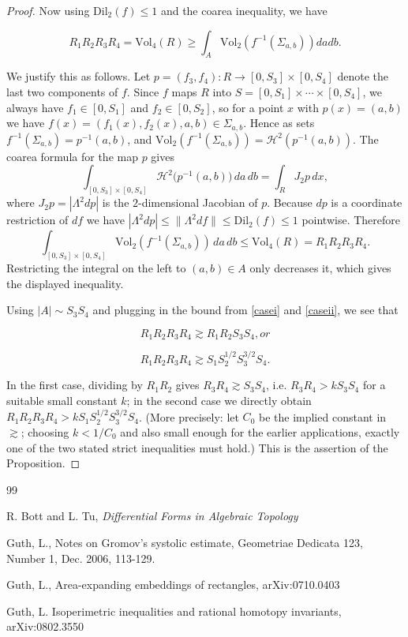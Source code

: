 \documentclass{amsart}
\newtheorem*{theorem 1}{Theorem 1}
\newtheorem*{theorem 2}{Theorem 2}
\newtheorem*{theorem 3}{Theorem 3}
\numberwithin{equation}{section}
\newcommand{\Dil}{\textrm{Dil}}
\newcommand{\Vol}{\textrm{Vol}}
\begin{document}
\begin{proof}
Now using $\Dil_2(f) \le 1$ and the coarea inequality,  we have

$$ R_1 R_2 R_3 R_4 = \Vol_4 (R) \ge \int_{A} \Vol_2(f^{-1}(\Sigma_{a,b})) da db. $$

We justify this as follows.  Let $p = (f_3, f_4): R \to [0,S_3]
\times [0, S_4]$ denote the last two components of $f$.  Since $f$
maps $R$ into $S = [0,S_1]\times\cdots\times[0,S_4]$, we always have
$f_1 \in [0,S_1]$ and $f_2 \in [0,S_2]$, so for a point $x$ with
$p(x) = (a,b)$ we have $f(x) = (f_1(x),f_2(x),a,b) \in
\Sigma_{a,b}$.  Hence as sets $f^{-1}(\Sigma_{a,b}) = p^{-1}(a,b)$,
and $\Vol_2(f^{-1}(\Sigma_{a,b})) = \mathcal H^2(p^{-1}(a,b))$.
The coarea formula for the map $p$ gives
$$ \int_{[0,S_3]\times[0,S_4]} \mathcal H^2\big(p^{-1}(a,b)\big)\,da\,db
   = \int_R J_2 p \, dx, $$
where $J_2 p = |\Lambda^2 dp|$ is the $2$-dimensional Jacobian of
$p$.  Because $dp$ is a coordinate restriction of $df$ we have
$|\Lambda^2 dp| \le \|\Lambda^2 df\| \le \Dil_2(f) \le 1$
pointwise.  Therefore
$$ \int_{[0,S_3]\times[0,S_4]} \Vol_2(f^{-1}(\Sigma_{a,b}))\,da\,db
   \le \Vol_4(R) = R_1 R_2 R_3 R_4. $$
Restricting the integral on the left to $(a,b)\in A$ only decreases
it, which gives the displayed inequality.

Using $|A| \sim S_3 S_4$ and plugging in the bound from \eqref{casei} and \eqref{caseii},  we see that

$$ R_1 R_2 R_3 R_4 \gtrsim R_1 R_2 S_3 S_4,  or $$

$$ R_1 R_2 R_3 R_4 \gtrsim S_1 S_2^{1/2} S_3^{3/2} S_4. $$

In the first case, dividing by $R_1 R_2$ gives $R_3 R_4 \gtrsim S_3
S_4$, i.e. $R_3 R_4 > k S_3 S_4$ for a suitable small constant $k$;
in the second case we directly obtain $R_1 R_2 R_3 R_4 > k S_1
S_2^{1/2} S_3^{3/2} S_4$.  (More precisely: let $C_0$ be the
implied constant in $\gtrsim$; choosing $k < 1/C_0$ and also small
enough for the earlier applications, exactly one of the two stated
strict inequalities must hold.)  This is the assertion of the
Proposition.
\end{proof}




\begin{thebibliography}{99}

 R. Bott and L. Tu,  {\it Differential Forms in Algebraic Topology}

 Guth, L., Notes on Gromov's systolic estimate,
Geometriae Dedicata 123, Number 1, Dec. 2006, 113-129.

 Guth, L., Area-expanding embeddings of rectangles, arXiv:0710.0403 

 Guth, L.  Isoperimetric inequalities and rational homotopy invariants, arXiv:0802.3550 


\end{thebibliography}
\end{document}
